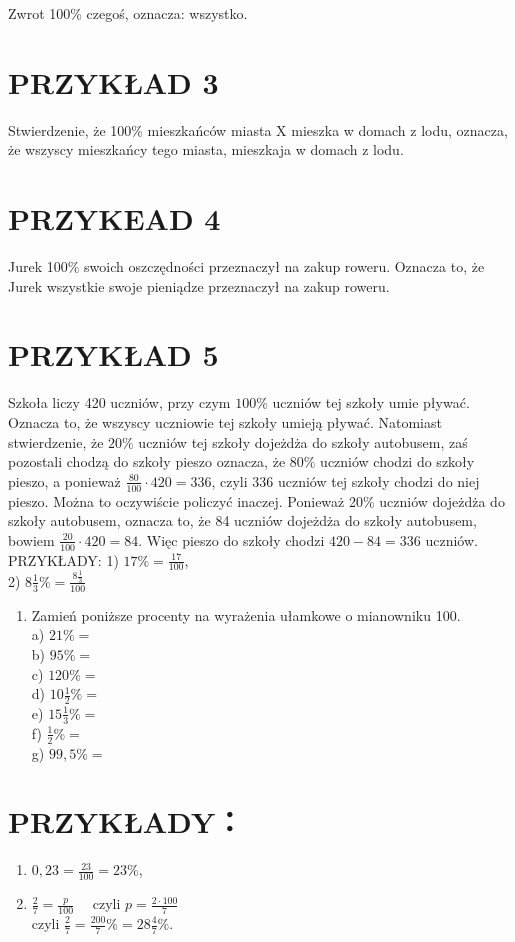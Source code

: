 \documentclass[10pt]{article}
\begin{document}
Zwrot 100\% czegoś, oznacza: wszystko.

\section*{PRZYKŁAD 3}
Stwierdzenie, że 100\% mieszkańców miasta X mieszka w domach z lodu, oznacza, że wszyscy mieszkańcy tego miasta, mieszkaja w domach z lodu.

\section*{PRZYKEAD 4}
Jurek 100\% swoich oszczędności przeznaczył na zakup roweru. Oznacza to, że Jurek wszystkie swoje pieniądze przeznaczył na zakup roweru.

\section*{PRZYKŁAD 5}
Szkoła liczy 420 uczniów, przy czym \(100 \%\) uczniów tej szkoły umie pływać. Oznacza to, że wszyscy uczniowie tej szkoły umieją pływać. Natomiast stwierdzenie, że \(20 \%\) uczniów tej szkoły dojeżdża do szkoły autobusem, zaś pozostali chodzą do szkoły pieszo oznacza, że \(80 \%\) uczniów chodzi do szkoły pieszo, a ponieważ \(\frac{80}{100} \cdot 420=336\), czyli 336 uczniów tej szkoły chodzi do niej pieszo. Można to oczywiście policzyć inaczej. Ponieważ 20\% uczniów dojeżdża do szkoły autobusem, oznacza to, że 84 uczniów dojeżdża do szkoły autobusem, bowiem \(\frac{20}{100} \cdot 420=84\). Więc pieszo do szkoły chodzi \(420-84=336\) uczniów.\\
PRZYKŁADY: 1) \(17 \%=\frac{17}{100}\),\\
2) \(8 \frac{1}{3} \%=\frac{8 \frac{1}{3}}{100}\)

\begin{enumerate}
  \item Zamień poniższe procenty na wyrażenia ułamkowe o mianowniku 100.\\
a) \(21 \%=\)\\
b) \(95 \%=\)\\
c) \(120 \%=\)\\
d) \(10 \frac{1}{2} \%=\)\\
e) \(15 \frac{1}{3} \%=\)\\
f) \(\frac{1}{2} \%=\)\\
g) \(99,5 \%=\)
\end{enumerate}

\section*{PRZYKŁADY：}
\begin{enumerate}
  \item \(0,23=\frac{23}{100}=23 \%\),
  \item \(\frac{2}{7}=\frac{p}{100} \quad\) czyli \(p=\frac{2 \cdot 100}{7}\)\\
czyli \(\frac{2}{7}=\frac{200}{7} \%=28 \frac{4}{7} \%\).
\end{enumerate}
\end{document}

